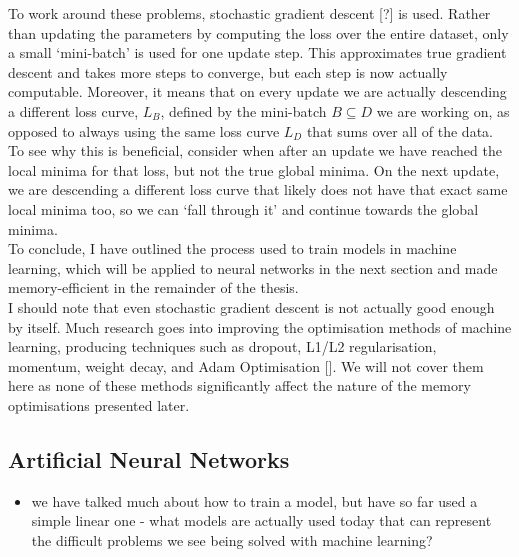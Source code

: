 To work around these problems, stochastic gradient descent [?] is used. Rather than updating the parameters by computing the loss over the entire dataset, only a small `mini-batch' is used for one update step. This approximates true gradient descent and takes more steps to converge, but each step is now actually computable. Moreover, it means that on every update we are actually descending a different loss curve, \(L_B\), defined by the mini-batch \(B\subseteq D\) we are working on, as opposed to always using the same loss curve \(L_D\) that sums over all of the data. To see why this is beneficial, consider when after an update we have reached the local minima for that loss, but not the true global minima. On the next update, we are descending a different loss curve that likely does not have that exact same local minima too, so we can ‘fall through it’ and continue towards the global minima. \\

To conclude, I have outlined the process used to train models in machine learning, which will be applied to neural networks in the next section and made memory-efficient in the remainder of the thesis. \\

I should note that even stochastic gradient descent is not actually good enough by itself. Much research goes into improving the optimisation methods of machine learning, producing techniques such as dropout, L1/L2 regularisation, momentum, weight decay, and Adam Optimisation []. We will not cover them here as none of these methods significantly affect the nature of the memory optimisations presented later.

\subsection{Artificial Neural Networks}
\begin{itemize}
    \item we have talked much about how to train a model, but have so far used a simple linear one - what models are actually used today that can represent the difficult problems we see being solved with machine learning?
    
\end{itemize}